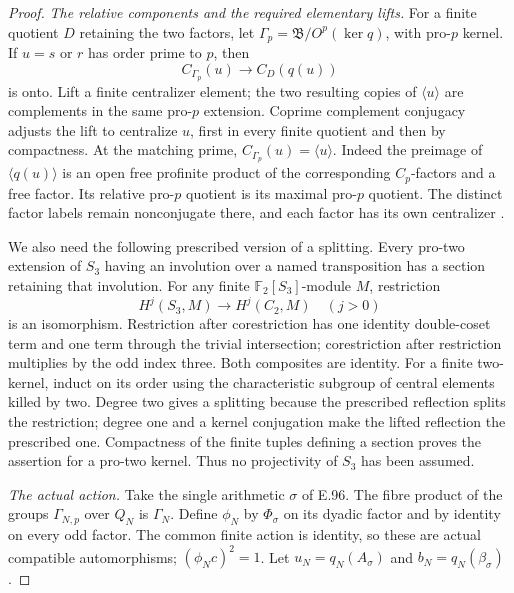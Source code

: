 \begin{proof}
\emph{The relative components and the required elementary lifts.}
For a finite quotient \(D\) retaining the two factors, let
\(\Gamma_p=\mathfrak B/O^p(\ker q)\), with pro-\(p\) kernel.
If \(u=s\) or \(r\) has order prime to \(p\), then
\[
 C_{\Gamma_p}(u)\longrightarrow C_D(q(u))
                                                        \tag{E.97.2}
\]
is onto.  Lift a finite centralizer element; the two resulting
copies of \(\langle u\rangle\) are complements in the same
pro-\(p\) extension.  Coprime complement conjugacy adjusts
the lift to centralize \(u\), first in every finite quotient
and then by compactness.
At the matching prime, \(C_{\Gamma_p}(u)=\langle u\rangle\).
Indeed the preimage of \(\langle q(u)\rangle\) is an open
free profinite product of the corresponding \(C_p\)-factors
and a free factor.  Its relative pro-\(p\) quotient is its
maximal pro-\(p\) quotient.  The distinct factor labels remain
nonconjugate there, and each factor has its own centralizer
\cite[Theorem~B', pp.159--160]{SymHerfortRibes1985}.

We also need the following prescribed version of a splitting.
Every pro-two extension of \(S_3\) having an involution over a
named transposition has a section retaining that involution.
For any finite \(\mathbb F_2[S_3]\)-module \(M\), restriction
\[
 H^j(S_3,M)\longrightarrow H^j(C_2,M)\quad(j>0)
                                                        \tag{E.97.3}
\]
is an isomorphism.  Restriction after corestriction has one
identity double-coset term and one term through the trivial
intersection; corestriction after restriction multiplies by
the odd index three.  Both composites are identity.
For a finite two-kernel, induct on its order using the
characteristic subgroup of central elements killed by two.
Degree two gives a splitting because the prescribed reflection
splits the restriction; degree one and a kernel conjugation
make the lifted reflection the prescribed one.
Compactness of the finite tuples defining a section proves
the assertion for a pro-two kernel.  Thus no projectivity of
\(S_3\) has been assumed.

\emph{The actual action.}
Take the single arithmetic \(\sigma\) of E.96.  The fibre product
of the groups \(\Gamma_{N,p}\) over \(Q_N\) is \(\Gamma_N\).
Define \(\phi_N\) by \(\Phi_\sigma\) on its dyadic factor and
by identity on every odd factor.
The common finite action is identity, so these are actual
compatible automorphisms; \((\phi_Nc)^2=1\).
Let \(u_N=q_N(A_\sigma)\) and \(b_N=q_N(\beta_\sigma)\).


\end{proof}
